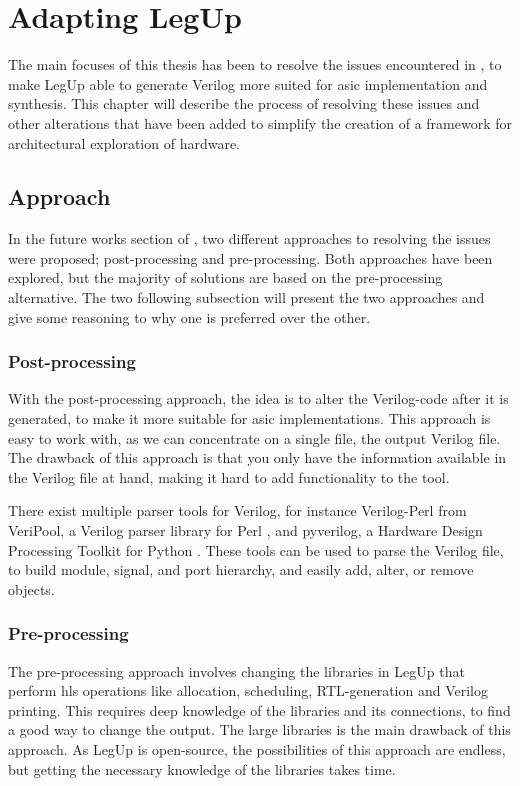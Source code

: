 \chapter{\label{chp:adaptinglegup}Adapting LegUp}
The main focuses of this thesis has been to resolve the issues encountered in \cite{holm2015pro}, to make LegUp able to generate Verilog more suited for \gls{asic} implementation and synthesis. This chapter will describe the process of resolving these issues and other alterations that have been added to simplify the creation of a framework for architectural exploration of hardware.
\section{Approach}
In the future works section of \cite{holm2015pro}, two different approaches to resolving the issues were proposed; post-processing and pre-processing. Both approaches have been explored, but the majority of solutions are based on the pre-processing alternative. The two following subsection will present the two approaches and give some reasoning to why one is preferred over the other.
\subsection{Post-processing}
With the post-processing approach, the idea is to alter the Verilog-code after it is generated, to make it more suitable for \gls{asic} implementations. This approach is easy to work with, as we can concentrate on a single file, the output Verilog file. The drawback of this approach is that you only have the information available in the Verilog file at hand, making it hard to add functionality to the tool.

There exist multiple parser tools for Verilog, for instance Verilog-Perl from VeriPool, a Verilog parser library for Perl \cite{verilogperl}, and pyverilog, a Hardware Design Processing Toolkit for Python \cite{Takamaeda2015Pyverilog}. These tools can be used to parse the Verilog file, to build module, signal, and port hierarchy, and easily add, alter, or remove objects.
\subsection{Pre-processing}
The pre-processing approach involves changing the libraries in LegUp that perform \gls{hls} operations like allocation, scheduling, RTL-generation and Verilog printing. This requires deep knowledge of the libraries and its connections, to find a good way to change the output. The large libraries is the main drawback of this approach. As LegUp is open-source, the possibilities of this approach are endless, but getting the necessary knowledge of the libraries takes time.
